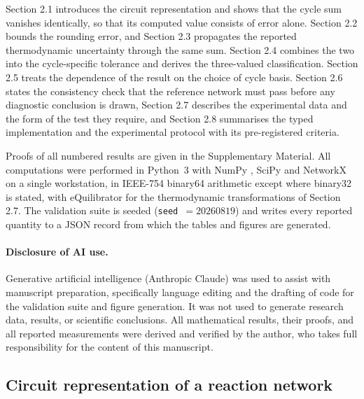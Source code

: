 \documentclass[11pt,a4paper]{article}
\theoremstyle{pstyle}
\theoremstyle{definition}
\theoremstyle{remark}
\begin{document}
Section 2.1 introduces the circuit representation and shows that
the cycle sum vanishes identically, so that its computed value consists
of error alone. Section 2.2 bounds the rounding error,
and Section 2.3 propagates the reported thermodynamic
uncertainty through the same sum. Section 2.4 combines the two
into the cycle-specific tolerance and derives the three-valued
classification. Section 2.5 treats the dependence of the result on
the choice of cycle basis. Section 2.6 states the consistency
check that the reference network must pass before any diagnostic
conclusion is drawn, Section 2.7 describes the experimental data
and the form of the test they require, and Section 2.8
summarises the typed implementation and the experimental protocol with
its pre-registered criteria.

Proofs of all numbered results are given in the Supplementary Material.
All computations were performed in Python~3 with NumPy \cite{harris2020},
SciPy \cite{virtanen2020} and NetworkX \cite{hagberg2008} on a single
workstation, in IEEE-754 binary64 arithmetic except where binary32 is
stated, with eQuilibrator \citep{beber2022} for the thermodynamic
transformations of Section 2.7. The validation suite is seeded
(\texttt{seed}~$=20260819$) and writes every reported quantity to a JSON
record from which the tables and figures are generated.

\paragraph{Disclosure of AI use.} Generative artificial intelligence
(Anthropic Claude) was used to assist with manuscript preparation,
specifically language editing and the drafting of code for the
validation suite and figure generation. It was not used to generate
research data, results, or scientific conclusions. All mathematical
results, their proofs, and all reported measurements were derived and
verified by the author, who takes full responsibility for the content
of this manuscript.

\subsection{Circuit representation of a reaction network}
\label{sec:circuit}
\end{document}

